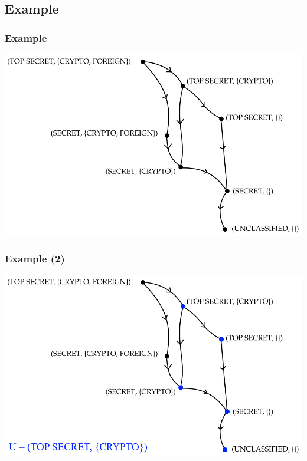 \documentclass[10pt]{beamer}
\begin{document}
\subsection{Example}
\begin{frame}
	\frametitle{Example}
	
	\includegraphics[width=\textwidth]{graphics/blp_lattice}
\end{frame}

\begin{frame}
	\frametitle{Example (2)}
	
	\includegraphics[width=\textwidth]{graphics/blp_lattice_2}
\end{frame}


{\aauwavesbg
\begin{frame}
\end{frame}}
\end{document}
